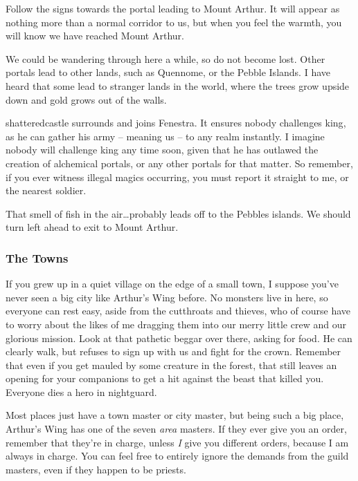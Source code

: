 \begin{multicols}{2}
\begin{exampletext}
	Follow the signs towards the portal leading to Mount Arthur.
	It will appear as nothing more than a normal corridor to us, but when you feel the warmth, you will know we have reached Mount Arthur.

	We could be wandering through here a while, so do not become lost.
	Other portals lead to other lands, such as Quennome, or the Pebble Islands.
	I have heard that some lead to stranger lands in the world, where the trees grow upside down and gold grows out of the walls.

	\Gls{shatteredcastle} surrounds and joins Fenestra.
	It ensures nobody challenges \gls{king}, as he can gather his army -- meaning us -- to any realm instantly.
	I imagine nobody will challenge \gls{king} any time soon, given that he has outlawed the creation of alchemical portals, or any other portals for that matter.
	So remember, if you ever witness illegal magics occurring, you must report it straight to me, or the nearest soldier.

	That smell of fish in the air\ldots probably leads off to the Pebbles islands.
	We should turn left ahead to exit to Mount Arthur.

\end{exampletext}

\subsubsection{The Towns}

\begin{exampletext}

	If you grew up in a quiet village on the edge of a small town, I suppose you've never seen a big city like Arthur's Wing before.
	No monsters live in here, so everyone can rest easy, aside from the cutthroats and thieves, who of course have to worry about the likes of me dragging them into our merry little crew and our glorious mission.
	Look at that pathetic beggar over there, asking for food.
	He can clearly walk, but refuses to sign up with us and fight for the crown.
	Remember that even if you get mauled by some creature in the forest, that still leaves an opening for your companions to get a hit against the beast that killed you.
	Everyone dies a hero in \gls{nightguard}.

	Most places just have a town master or city master, but being such a big place, Arthur's Wing has one of the seven \textit{area} masters.
	If they ever give you an order, remember that they're in charge, unless \emph{I} give you different orders, because I am always in charge.
	You can feel free to entirely ignore the demands from the guild masters, even if they happen to be priests.


\end{exampletext}
\end{multicols}
